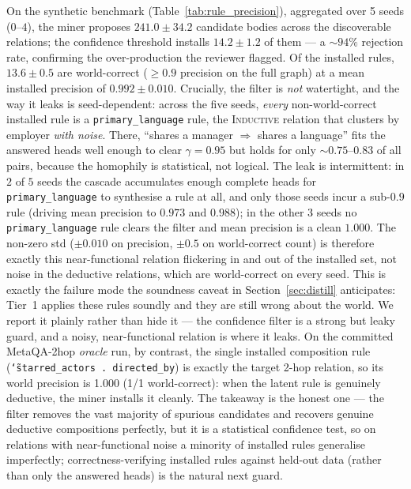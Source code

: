 \documentclass[11pt]{article}
\theoremstyle{plain}
\newcommand{\ruleProposed}{$241.0 \pm 34.2$}
\newcommand{\ruleInstalled}{$14.2 \pm 1.2$}
\newcommand{\ruleWorldCorrect}{$13.6 \pm 0.5$}
\newcommand{\ruleMeanPrec}{$0.992 \pm 0.010$}
\newcommand{\ruleSeeds}{5}
\newcommand{\oracleRuleInstalled}{1}
\newcommand{\oracleRuleWorldCorrect}{1}
\newcommand{\oracleRuleMeanPrec}{1.000}
\renewcommand{\ruleProposed}{$241.0 \pm 34.2$}
\renewcommand{\ruleInstalled}{$14.2 \pm 1.2$}
\renewcommand{\ruleWorldCorrect}{$13.6 \pm 0.5$}
\renewcommand{\ruleMeanPrec}{$0.992 \pm 0.010$}
\renewcommand{\ruleSeeds}{5}
\renewcommand{\oracleRuleInstalled}{1}
\renewcommand{\oracleRuleWorldCorrect}{1}
\renewcommand{\oracleRuleMeanPrec}{1.000}
\begin{document}
On the synthetic benchmark (Table~\ref{tab:rule_precision}), aggregated over
\ruleSeeds{} seeds ($0$--$4$), the miner proposes \ruleProposed{} candidate
bodies across the discoverable relations; the confidence threshold installs
\ruleInstalled{} of them --- a ${\sim}94\%$ rejection rate, confirming the
over-production the reviewer flagged. Of the installed rules, \ruleWorldCorrect{}
are world-correct ($\ge 0.9$ precision on the full graph) at a mean installed
precision of \ruleMeanPrec{}. Crucially, the filter is \emph{not} watertight, and
the way it leaks is seed-dependent: across the five seeds, \emph{every}
non-world-correct installed rule is a \texttt{primary\_language} rule, the
\textsc{Inductive} relation that clusters by employer \emph{with noise}. There,
``shares a manager $\Rightarrow$ shares a language'' fits the answered heads
well enough to clear $\gamma{=}0.95$ but holds for only ${\sim}0.75$--$0.83$ of
all pairs, because the homophily is statistical, not logical. The leak is
intermittent: in $2$ of $5$ seeds the cascade accumulates enough complete heads
for \texttt{primary\_language} to synthesise a rule at all, and only those seeds
incur a sub-$0.9$ rule (driving mean precision to $0.973$ and $0.988$); in the
other $3$ seeds no \texttt{primary\_language} rule clears the filter and mean
precision is a clean $1.000$. The non-zero std ($\pm 0.010$ on precision,
$\pm 0.5$ on world-correct count) is therefore exactly this near-functional
relation flickering in and out of the installed set, not noise in the deductive
relations, which are world-correct on every seed. This is exactly the failure
mode the soundness caveat in Section~\ref{sec:distill} anticipates: Tier~1
applies these rules soundly and they are still wrong about the world. We report
it plainly rather than hide it --- the confidence filter is a strong but leaky
guard, and a noisy, near-functional relation is where it leaks. On the
committed MetaQA-2hop \emph{oracle} run, by contrast, the single installed
composition rule (\texttt{\char`\~starred\_actors\,.\,directed\_by}) is exactly
the target 2-hop relation, so its world precision is
\oracleRuleMeanPrec{} (\oracleRuleWorldCorrect{}/\oracleRuleInstalled{}
world-correct): when the latent rule is genuinely deductive, the miner installs
it cleanly. The takeaway is the honest one --- the filter removes the vast
majority of spurious candidates and recovers genuine deductive compositions
perfectly, but it is a statistical confidence test, so on relations with
near-functional noise a minority of installed rules generalise imperfectly;
correctness-verifying installed rules against held-out data (rather than only
the answered heads) is the natural next guard.
\end{document}
